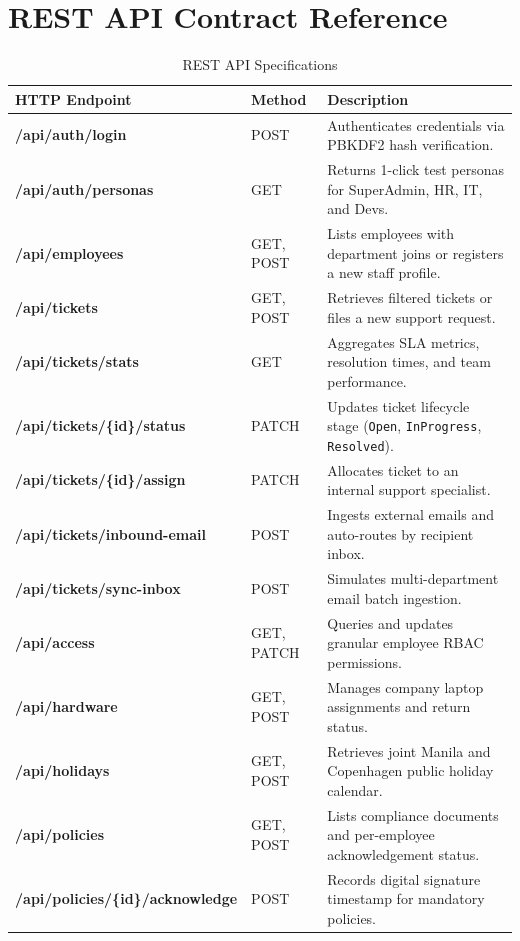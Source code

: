 \documentclass[a4paper,11pt]{article}
\begin{document}
\section{REST API Contract Reference}

\begin{table}[!ht]
\centering
\small
\begin{tabularx}{\textwidth}{>{\bfseries\ttfamily}p{5.5cm} p{2.2cm} X}
\toprule
HTTP Endpoint & Method & Description \\
\midrule
/api/auth/login & POST & Authenticates credentials via PBKDF2 hash verification. \\
/api/auth/personas & GET & Returns 1-click test personas for SuperAdmin, HR, IT, and Devs. \\
/api/employees & GET, POST & Lists employees with department joins or registers a new staff profile. \\
/api/tickets & GET, POST & Retrieves filtered tickets or files a new support request. \\
/api/tickets/stats & GET & Aggregates SLA metrics, resolution times, and team performance. \\
/api/tickets/\{id\}/status & PATCH & Updates ticket lifecycle stage (\texttt{Open}, \texttt{InProgress}, \texttt{Resolved}). \\
/api/tickets/\{id\}/assign & PATCH & Allocates ticket to an internal support specialist. \\
/api/tickets/inbound-email & POST & Ingests external emails and auto-routes by recipient inbox. \\
/api/tickets/sync-inbox & POST & Simulates multi-department email batch ingestion. \\
/api/access & GET, PATCH & Queries and updates granular employee RBAC permissions. \\
/api/hardware & GET, POST & Manages company laptop assignments and return status. \\
/api/holidays & GET, POST & Retrieves joint Manila and Copenhagen public holiday calendar. \\
/api/policies & GET, POST & Lists compliance documents and per-employee acknowledgement status. \\
/api/policies/\{id\}/acknowledge & POST & Records digital signature timestamp for mandatory policies. \\
\bottomrule
\end{tabularx}
\caption{REST API Specifications}
\end{table}
\end{document}

